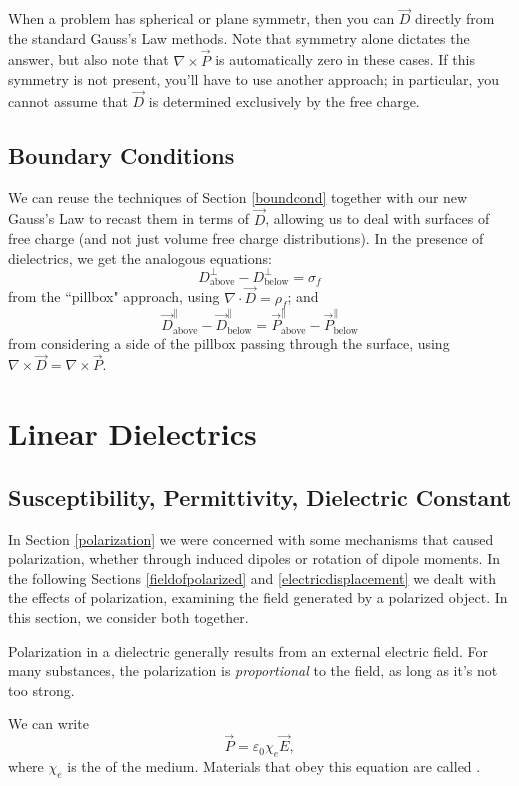 When a problem has spherical or plane symmetr, then you can $\vec{D}$ directly from the standard Gauss's Law methods. Note that symmetry alone dictates the answer, but also note that $\nabla\times\vec{P}$ is automatically zero in these cases. If this symmetry is not present, you'll have to use another approach; in particular, you cannot assume that $\vec{D}$ is determined exclusively by the free charge.

\subsection{Boundary Conditions}

We can reuse the techniques of Section \ref{boundcond} together with our new Gauss's Law to recast them in terms of $\vec{D}$, allowing us to deal with surfaces of free charge (and not just volume free charge  distributions). In the presence of dielectrics, we get the analogous equations:
\[\boxed{D_{\text{above}}^\perp - D_{\text{below}}^\perp = \sigma_f}\]
from the ``pillbox" approach, using $\nabla\cdot \vec{D}=\rho_f$; and
\[\boxed{\vec{D}_{\text{above}}^\parallel-\vec{D}_{\text{below}}^\parallel =\vec{P}_{\text{above}}^\parallel-\vec{P}_{\text{below}}^\parallel}\]
from considering a side of the pillbox passing through the surface, using $\nabla\times \vec{D}=\nabla\times\vec{P}$.

\section{Linear Dielectrics}

\subsection{Susceptibility, Permittivity, Dielectric Constant}

In Section \ref{polarization} we were concerned with some mechanisms that caused polarization, whether through induced dipoles or rotation of dipole moments. In the following Sections \ref{fieldofpolarized} and \ref{electricdisplacement} we dealt with the effects of polarization, examining the field generated by a polarized object. In this section, we consider both together. 

Polarization in a dielectric generally results from an external electric field. For many substances, the polarization is \textit{proportional} to the field, as long as it's not too strong. 

\begin{definition}
We can write
\[\vec{P}=\varepsilon_0\chi_e\vec{E},\]
where $\chi_e$ is the  of the medium. Materials that obey this equation are called .
\end{definition}

